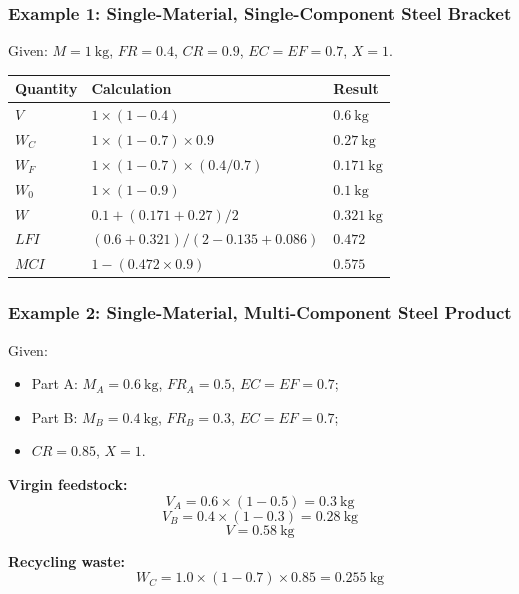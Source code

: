 \documentclass{NoteThesis/note-thesis}
\begin{document}
\subsubsection{Example 1: Single-Material, Single-Component Steel Bracket}

Given: $M = 1\ \text{kg}$, $FR = 0.4$, $CR = 0.9$, $EC = EF = 0.7$, $X = 1$.

\begin{table}[h]
    \centering
    \begin{tabular}{lll}
        \hline
        Quantity & Calculation & Result \\
        \hline
        $V$ & $1 \times (1 - 0.4)$ & $0.6\ \text{kg}$ \\
        $W_C$ & $1 \times (1 - 0.7) \times 0.9$ & $0.27\ \text{kg}$ \\
        $W_F$ & $1 \times (1 - 0.7) \times (0.4 / 0.7)$ & $0.171\ \text{kg}$ \\
        $W_0$ & $1 \times (1 - 0.9)$ & $0.1\ \text{kg}$ \\
        $W$ & $0.1 + (0.171 + 0.27)/2$ & $0.321\ \text{kg}$ \\
        $LFI$ & $(0.6 + 0.321) / (2 - 0.135 + 0.086)$ & $0.472$ \\
        $MCI$ & $1 - (0.472 \times 0.9)$ & $\mathbf{0.575}$ \\
        \hline
    \end{tabular}
\end{table}

\subsubsection{Example 2: Single-Material, Multi-Component Steel Product}

Given:
\begin{itemize}
    \item Part A: $M_A = 0.6\ \text{kg}$, $FR_A = 0.5$, $EC = EF = 0.7$;
    \item Part B: $M_B = 0.4\ \text{kg}$, $FR_B = 0.3$, $EC = EF = 0.7$;
    \item $CR = 0.85$, $X = 1$.
\end{itemize}

\textbf{Virgin feedstock:}
\[
    V_A = 0.6 \times (1 - 0.5) = 0.3\ \text{kg}
\]
\[
    V_B = 0.4 \times (1 - 0.3) = 0.28\ \text{kg}
\]
\[
    V = 0.58\ \text{kg}
\]

\textbf{Recycling waste:}
\[
    W_C = 1.0 \times (1 - 0.7) \times 0.85 = 0.255\ \text{kg}
\]
\end{document}
